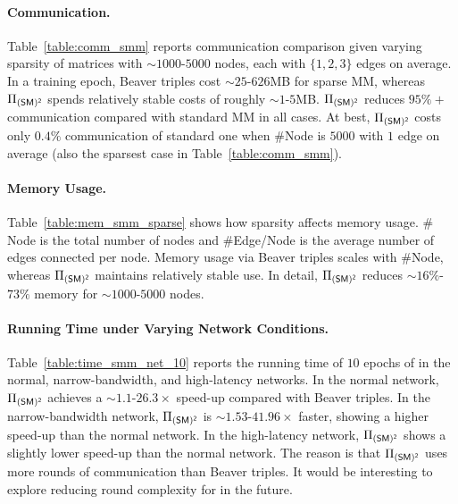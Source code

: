 \paragraph{Communication.} 
\label{sec::smmcomm}
Table~\ref{table:comm_smm} reports communication comparison given varying sparsity of matrices with ${\sim}1000$-$5000$ nodes, each with $\{1, 2, 3\}$ edges on average.
In a training epoch, Beaver triples cost ${\sim}25$-$626$MB for sparse MM, whereas $\Pi_{\mathsf{(SM)^2}}$ spends relatively stable costs of roughly
\mbox{${\sim}1$-$5$MB.}
$\Pi_{\mathsf{(SM)^2}}$ reduces $95\%+$ communication compared with standard MM in all cases.
At best, $\Pi_{\mathsf{(SM)^2}}$ costs only $0.4\%$ communication of standard one when $\#$Node is $5000$ with $1$ edge on average (also the sparsest case in Table~\ref{table:comm_smm}).




\paragraph{Memory Usage.}
Table~\ref{table:mem_smm_sparse} shows how sparsity affects memory usage.
$\#$Node is the total number of nodes and $\#$Edge/Node is the average number of edges connected per node.
Memory usage via Beaver triples scales with $\#$Node, whereas $\Pi_{\mathsf{(SM)^2}}$ maintains relatively stable use.
In detail, $\Pi_{\mathsf{(SM)^2}}$ reduces ${\sim}16\%$-$73\%$ memory for ${\sim}1000$-$5000$ nodes.


\paragraph{Running Time under Varying Network Conditions.}
Table~\ref{table:time_smm_net_10} reports the running time of $10$ epochs of \osmm in the normal, narrow-bandwidth, and high-latency networks.
In the normal network, $\Pi_{\mathsf{(SM)^2}}$ achieves a ${\sim}1.1$-$26.3\times$ speed-up compared with Beaver triples.
In the narrow-bandwidth network, $\Pi_{\mathsf{(SM)^2}}$ is ${\sim}1.53$-$41.96\times$ faster, showing a higher speed-up than the normal network.
In the high-latency network, $\Pi_{\mathsf{(SM)^2}}$ shows a slightly lower speed-up than the normal network.
 The reason is that $\Pi_{\mathsf{(SM)^2}}$ uses more rounds of communication than Beaver triples.
 It would be interesting to explore reducing round complexity for \osmm in the future.

